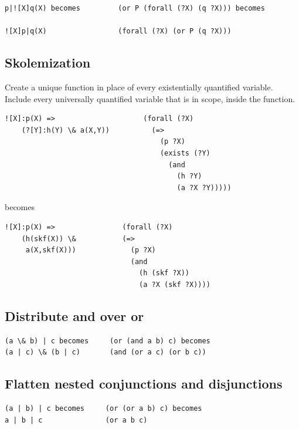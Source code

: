 \documentclass{book}
\begin{document}
\begin{verbatim}
p|![X]q(X) becomes         (or P (forall (?X) (q ?X))) becomes

![X]p|q(X)                 (forall (?X) (or P (q ?X)))
\end{verbatim}

\subsection{Skolemization}

Create a unique function in place of every existentially quantified variable.
Include every universally quantified variable that is in scope, inside the
function.

\begin{verbatim}
![X]:p(X) =>                     (forall (?X)
    (?[Y]:h(Y) \& a(X,Y))          (=>
                                     (p ?X)
                                     (exists (?Y)
                                       (and
                                         (h ?Y)
                                         (a ?X ?Y)))))
\end{verbatim}

becomes

\begin{verbatim}
![X]:p(X) => 	            (forall (?X)
    (h(skf(X)) \&           (=>
     a(X,skf(X)))             (p ?X)
                              (and
                                (h (skf ?X))
                                (a ?X (skf ?X))))
\end{verbatim}


\subsection{Distribute and over or}

\begin{verbatim}
(a \& b) | c becomes     (or (and a b) c) becomes
(a | c) \& (b | c)       (and (or a c) (or b c))
\end{verbatim}

\subsection{Flatten nested conjunctions and disjunctions}

\begin{verbatim}
(a | b) | c becomes     (or (or a b) c) becomes
a | b | c               (or a b c)
\end{verbatim}
\end{document}
